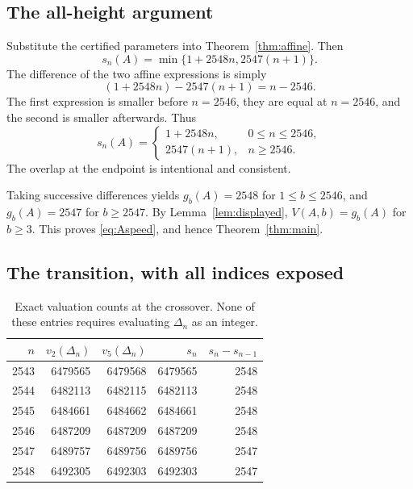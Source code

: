 \documentclass[11pt,a4paper]{article}
\theoremstyle{definition}
\theoremstyle{remark}
\begin{document}
\subsection{The all-height argument}
Substitute the certified parameters into Theorem~\ref{thm:affine}. Then
\[
 s_n(A)=\min\{1+2548n,2547(n+1)\}.
\]
The difference of the two affine expressions is simply
\begin{equation}\label{eq:difference}
 (1+2548n)-2547(n+1)=n-2546.
\end{equation}
The first expression is smaller before $n=2546$, they are equal at $n=2546$, and the second is smaller afterwards. Thus
\begin{equation}\label{eq:piecewiseS}
 s_n(A)=
 \begin{cases}
 1+2548n,&0\le n\le2546,\\
 2547(n+1),&n\ge2546.
 \end{cases}
\end{equation}
The overlap at the endpoint is intentional and consistent.

Taking successive differences yields $g_b(A)=2548$ for $1\le b\le2546$, and $g_b(A)=2547$ for $b\ge2547$. By Lemma~\ref{lem:displayed}, $V(A,b)=g_b(A)$ for $b\ge3$. This proves \eqref{eq:Aspeed}, and hence Theorem~\ref{thm:main}.

\subsection{The transition, with all indices exposed}
\begin{table}[ht]
\centering
\small
\begin{tabular}{@{}rrrrr@{}}
\toprule
$n$ & $v_2(\Delta_n)$ & $v_5(\Delta_n)$ & $s_n$ & $s_n-s_{n-1}$\\
\midrule
2543 & 6479565 & 6479568 & 6479565 & 2548\\
2544 & 6482113 & 6482115 & 6482113 & 2548\\
2545 & 6484661 & 6484662 & 6484661 & 2548\\
2546 & 6487209 & 6487209 & 6487209 & 2548\\
2547 & 6489757 & 6489756 & 6489756 & 2547\\
2548 & 6492305 & 6492303 & 6492303 & 2547\\
\bottomrule
\end{tabular}
\caption{Exact valuation counts at the crossover. None of these entries requires evaluating $\Delta_n$ as an integer.}
\label{tab:transition}
\end{table}
\end{document}
